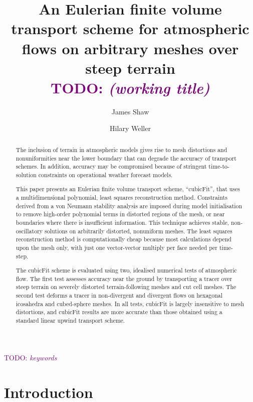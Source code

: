 \documentclass[times]{elsarticle}
\newcommand{\TODO}[1]{\textcolor{purple}{TODO: \emph{#1}}}
\begin{document}
\begin{frontmatter}
\title{An Eulerian finite volume transport scheme for atmospheric flows on arbitrary meshes over steep terrain \\ \TODO{(working title)}}
\author[uor]{James Shaw}
\author[uor]{Hilary Weller}

\address[uor]{Department of Meteorology, University of Reading, Reading, United Kingdom}

\begin{abstract}
The inclusion of terrain in atmospheric models gives rise to mesh distortions and nonuniformities near the lower boundary that can degrade the accuracy of transport schemes.  In addition, accuracy may be compromised because of stringent time-to-solution constraints on operational weather forecast models.

This paper presents an Eulerian finite volume transport scheme, ``cubicFit'', that uses a multidimensional polynomial, least squares reconstruction method.  Constraints derived from a von Neumann stability analysis are imposed during model initialisation to remove high-order polynomial terms in distorted regions of the mesh, or near boundaries where there is insufficient information.  This technique achieves stable, non-oscillatory solutions on arbitrarily distorted, nonuniform meshes.  The least squares reconstruction method is computationally cheap because most calculations depend upon the mesh only, with just one vector-vector multiply per face needed per time-step.

The cubicFit scheme is evaluated using two, idealised numerical tests of atmospheric flow.  The first test assesses accuracy near the ground by transporting a tracer over steep terrain on severely distorted terrain-following meshes and cut cell meshes.  The second test deforms a tracer in non-divergent and divergent flows on hexagonal icosahedra and cubed-sphere meshes.
In all tests, cubicFit is largely insensitive to mesh distortions, and cubicFit results are more accurate than those obtained using a standard linear upwind transport scheme.
\end{abstract}

\begin{keyword}
	\TODO{keywords}
\end{keyword}
\end{frontmatter}

\section{Introduction}

\end{document}
